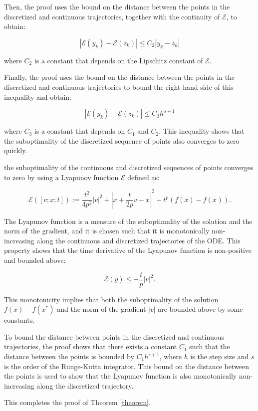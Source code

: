 \begin{enumerate}
          Then, the proof uses the bound on the distance between the points in the discretized and continuous trajectories, together with the continuity of $\mathcal{E}$, to obtain:

          $$
              |\mathcal{E}(y_k) - \mathcal{E}(z_k)| \le C_2 |y_k - z_k|
          $$

          where $C_2$ is a constant that depends on the Lipschitz constant of $\mathcal{E}$.

          Finally, the proof uses the bound on the distance between the points in the discretized and continuous trajectories to bound the right-hand side of this inequality and obtain:

          $$
              |\mathcal{E}(y_k) - \mathcal{E}(z_k)| \le C_3 h^{s+1}
          $$

          where $C_3$ is a constant that depends on $C_1$ and $C_2$. This inequality shows that the suboptimality of the discretized sequence of points also converges to zero quickly.

          the suboptimality of the continuous and discretized sequences of points converges to zero by using a Lyapunov function $\mathcal{E}$ defined as:

          $$
              \mathcal{E}([v ; x ; t]):=\frac{t^{2}}{4 p^{2}}|v|^{2}+\left|x+\frac{t}{2 p} v-x^{}\right|^{2}+t^{p}\left(f(x)-f\left(x^{}\right)\right) .
          $$

          The Lyapunov function is a measure of the suboptimality of the solution and the norm of the gradient, and it is chosen such that it is monotonically non-increasing along the continuous and discretized trajectories of the ODE. This property shows that the time derivative of the Lyapunov function is non-positive and bounded above:

          $$
              \dot{\mathcal{E}}(y) \leq-\frac{t}{p}|v|^{2} .
          $$

          This monotonicity implies that both the suboptimality of the solution $f(x) - f(x^*)$ and the norm of the gradient $|v|$ are bounded above by some constants.

          To bound the distance between points in the discretized and continuous trajectories, the proof shows that there exists a constant $C_1$ such that the distance between the points is bounded by $C_1 h^{s+1}$, where $h$ is the step size and $s$ is the order of the Runge-Kutta integrator. This bound on the distance between the points is used to show that the Lyapunov function is also monotonically non-increasing along the discretized trajectory.



          This completes the proof of Theorem \ref{theorem}.
\end{enumerate}
